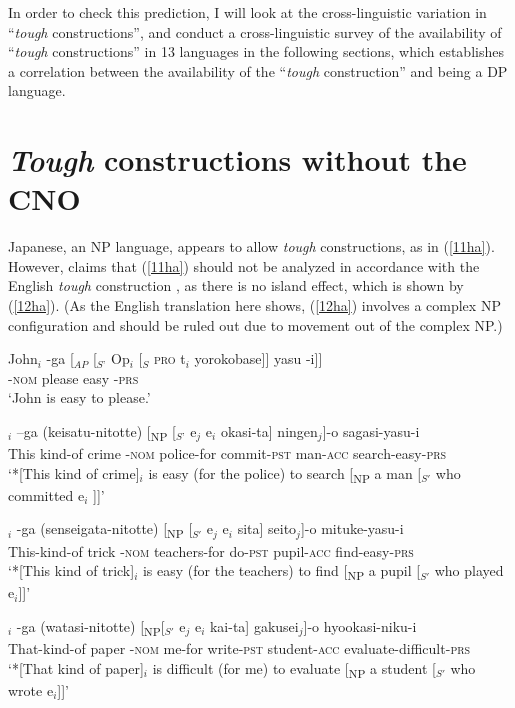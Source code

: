 \documentclass[output=paper]{langscibook}
\begin{document}
In order to check this prediction, I will look at the cross-linguistic variation in “\textit{tough} constructions”, and conduct a cross-linguistic survey of the availability of “\textit{tough} constructions” in 13 languages in the following sections, which establishes a correlation between the availability of the “\textit{tough} construction” and being a DP language.

\section{\textit{Tough} constructions without the CNO}
Japanese, an NP language, appears to allow \textit{tough} constructions, as in (\ref{11ha}). However, \citet{takezawa1987} claims that (\ref{11ha}) should not be analyzed in accordance with the English \textit{tough} construction \citep{Chomsky1977}, as there is no island effect, which is shown by (\ref{12ha}). (As the English translation here shows, (\ref{12ha}) involves a complex NP configuration and should be ruled out due to movement out of the complex NP.) 

\begin{exe}
\ex \label{11ha}
\gll John$_{i}$ -ga [$_{AP}$ [$_{S’}$ Op$_{i}$ [$_{S}$ \textsc{pro} t$_{i}$ yorokobase]] yasu -i]]\\
{} -\textsc{nom} {} {} {} {} {} {} please easy -\textsc{prs}\\
\glt ‘John is easy to please.’

\ex \label{12ha}
\begin{xlist}
\ex \label{12aha}
$_{i}$ –ga (keisatu-nitotte) [\textsubscript{NP} [$_{S’}$ e$_{j}$ e$_{i}$ okasi-ta] ningen$_{j}$]-o  sagasi-yasu-i\\
This kind-of crime -\textsc{nom} police-for {} {} {} {} commit-\textsc{pst} man-\textsc{acc} search-easy-\textsc{prs}\\
\glt `*[This kind of crime]$_{i}$ is easy (for the police) to search [\textsubscript{NP} a man [$_{S'}$ who committed e$_{i}$ ]]'

\ex \label{12bha}
$_{i}$ -ga (senseigata-nitotte) [\textsubscript{NP} [$_{S'}$ e$_{j}$ e$_{i}$ sita] seito$_{j}$]-o    mituke-yasu-i\\
This-kind-of trick -\textsc{nom} teachers-for {} {} {} {} do-\textsc{pst} pupil-\textsc{acc} find-easy-\textsc{prs}\\
\glt `*[This kind of trick]$_{i}$ is easy (for the teachers) to find [\textsubscript{NP} a pupil [$_{S'}$ who played e$_{i}$]]'



\ex \label{12cha}
$_{i}$ -ga (watasi-nitotte) [\textsubscript{NP}[$_{S'}$ e$_{j}$ e$_{i}$ kai-ta] gakusei$_{j}$]-o  hyookasi-niku-i\\
That-kind-of paper  -\textsc{nom}  me-for  {} {} {}   write-\textsc{pst} student-\textsc{acc} evaluate-difficult-\textsc{prs}\\
\glt `*[That kind of paper]$_{i}$ is difficult (for me) to evaluate [\textsubscript{NP} a student [$_{S'}$ who wrote e$_{i}$]]’ 
\end{xlist}
\end{exe}
\end{document}
